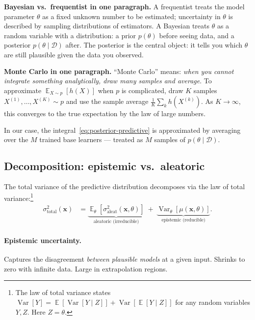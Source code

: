\documentclass[11pt,a4paper]{article}
\DeclareMathOperator{\Var}{Var}
\DeclareMathOperator{\E}{\mathbb{E}}
\begin{document}
\begin{recapbox}
\textbf{Bayesian vs.\ frequentist in one paragraph.} A frequentist treats the model parameter $\theta$ as a fixed unknown number to be estimated; uncertainty in $\theta$ is described by sampling distributions of estimators. A Bayesian treats $\theta$ as a random variable with a distribution: a prior $p(\theta)$ before seeing data, and a posterior $p(\theta \mid \mathcal{D})$ after. The posterior is the central object: it tells you which $\theta$ are still plausible given the data you observed.
\end{recapbox}

\begin{recapbox}
\textbf{Monte Carlo in one paragraph.} ``Monte Carlo'' means: \emph{when you cannot integrate something analytically, draw many samples and average}. To approximate $\E_{X \sim p}[h(X)]$ when $p$ is complicated, draw $K$ samples $X^{(1)}, \ldots, X^{(K)} \sim p$ and use the sample average $\frac{1}{K}\sum_k h(X^{(k)})$. As $K \to \infty$, this converges to the true expectation by the law of large numbers.

In our case, the integral~\eqref{eq:posterior-predictive} is approximated by averaging over the $M$ trained base learners --- treated as $M$ samples of $p(\theta \mid \mathcal{D})$.
\end{recapbox}

\subsection{Decomposition: epistemic vs.\ aleatoric}

The total variance of the predictive distribution decomposes via the law of total variance:\footnote{The law of total variance states $\Var[Y] = \E[\Var[Y \mid Z]] + \Var[\E[Y \mid Z]]$ for any random variables $Y, Z$. Here $Z = \theta$.}
\begin{align}
\sigma_{\text{total}}^2(\bm x)
&= \underbrace{\E_\theta\!\left[ \sigma^2_{\text{aleat}}(\bm x, \theta) \right]}_{\text{aleatoric (irreducible)}}
   \; + \;
   \underbrace{\Var_\theta\!\left[ \mu(\bm x, \theta) \right]}_{\text{epistemic (reducible)}}.
\label{eq:total-variance-decomp}
\end{align}

\paragraph{Epistemic uncertainty.} Captures the disagreement \emph{between plausible models} at a given input. Shrinks to zero with infinite data. Large in extrapolation regions.
\end{document}
